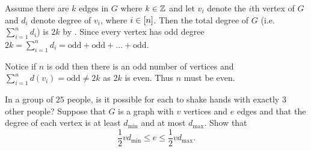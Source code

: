 \begin{chapterendexercises}
\begin{solution}
      Assume there are $k$ edges in $G$ where $k \in {\mathbb{Z}}$ and let $v_i$ denote
      the $i$th vertex of $G$ and $d_i$ denote degree of $v_i$, where $i \in
      {[{n}]}$. Then the total degree of $G$ (i.e. $\sum_{i = 1}^n d_i$)
      is $2k$ by . Since every vertex has odd
      degree $2k = \sum_{i = 1}^{n} d_i = \mathrm{odd} + \mathrm{odd} + \dots +
      \mathrm{odd}$.

      Notice if $n$ is odd then there is an odd number of vertices and
      $\sum_{i = 1}^n d(v_i) = \mathrm{odd} \neq 2k$ as $2k$ is even. Thus $n$
      must be even.
    \end{solution}
  \exercise In a group of $25$ people, is it possible for each to shake hands
    with exactly $3$ other people?
  \exercise Suppose that $G$ is a graph with $v$ vertices and $e$ edges and
    that the degree of each vertex is at least $d_\mathrm{min}$ and at most
    $d_\mathrm{max}$. Show that
    \[
      \frac{1}{2} v d_\mathrm{min} \le e \le \frac{1}{2} v d_\mathrm{max}.
    \]
\end{chapterendexercises}
